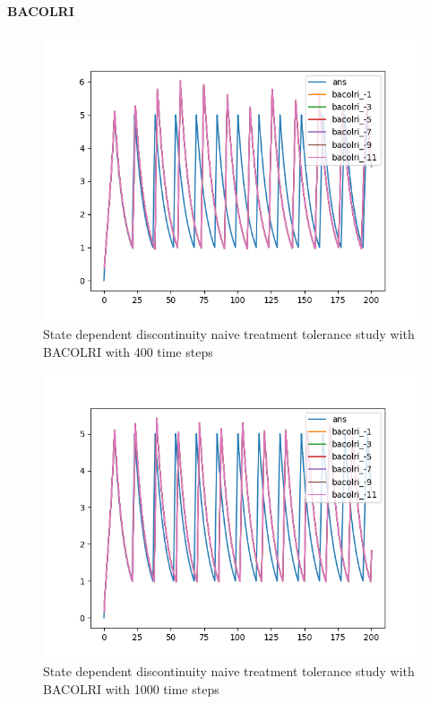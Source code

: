 \documentclass{article}
\begin{document}
\paragraph{BACOLRI}
\begin{figure}[H]
\centering
\includegraphics[width=0.7\linewidth]{./figures/pde_state_disc_tol_bacolri_400}
\caption{State dependent discontinuity naive treatment tolerance study with BACOLRI with 400 time steps}
\label{fig:pde_state_disc_tol_bacolri_400}
\end{figure}

\begin{figure}[H]
\centering
\includegraphics[width=0.7\linewidth]{./figures/pde_state_disc_tol_bacolri_1000}
\caption{State dependent discontinuity naive treatment tolerance study with BACOLRI with 1000 time steps}
\label{fig:pde_state_disc_tol_bacolri_1000}
\end{figure}
\end{document}
